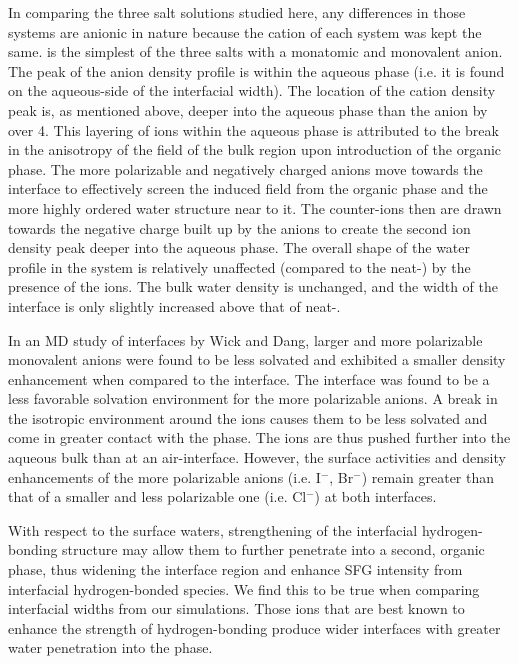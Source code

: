 In comparing the three salt solutions studied here, any differences in those systems are anionic in nature because the cation of each system was kept the same. \nacl is the simplest of the three salts with a monatomic and monovalent anion. The peak of the anion density profile is within the aqueous phase (i.e. it is found on the aqueous-side of the interfacial width). The location of the cation density peak is, as mentioned above, deeper into the aqueous phase than the anion by over 4\angs. This layering of ions within the aqueous phase is attributed to the break in the anisotropy of the field of the bulk region upon introduction of the organic phase. The more polarizable and negatively charged anions move towards the interface to effectively screen the induced field from the organic phase and the more highly ordered water structure near to it. The counter-ions then are drawn towards the negative charge built up by the anions to create the second ion density peak deeper into the aqueous phase. The overall shape of the water profile in the \nacl system is relatively unaffected (compared to the neat-\wat) by the presence of the ions. The bulk water density is unchanged, and the width of the interface is only slightly increased above that of neat-\wat.

In an MD study of \ctcwat interfaces by Wick and Dang,\cite{Wick2007a} larger and more polarizable monovalent anions were found to be less solvated and exhibited a smaller density enhancement when compared to the \airwat interface. The \ctcwat interface was found to be a less favorable solvation environment for the more polarizable anions. A break in the isotropic environment around the ions causes them to be less solvated and come in greater contact with the \ctc phase. The ions are thus pushed further into the aqueous bulk than at an air-interface. However, the surface activities and density enhancements of the more polarizable anions (i.e. I$^-$, Br$^-$) remain greater than that of a smaller and less polarizable one (i.e. Cl$^-$) at both interfaces. 

With respect to the surface waters, strengthening of the interfacial hydrogen-bonding structure may allow them to further penetrate into a second, organic phase, thus widening the interface region and enhance SFG intensity from interfacial hydrogen-bonded species. We find this to be true when comparing interfacial widths from our simulations. Those ions that are best known to enhance the strength of hydrogen-bonding produce wider interfaces with greater water penetration into the \ctc phase.

